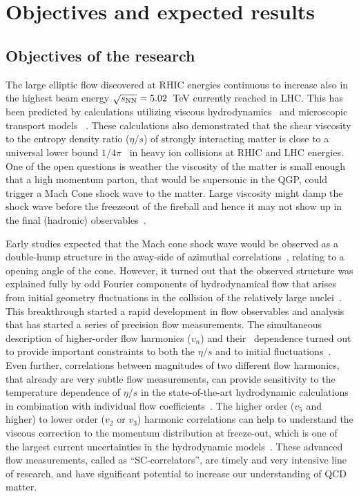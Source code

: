\section{Objectives and expected results} %
\label{sec:objectives}

\subsection{Objectives of the research}

The large elliptic flow discovered at RHIC energies continuous to increase also in the highest beam energy $\sqrt{s_{\rm NN}}=5.02$~TeV currently reached in LHC. This has been predicted by calculations utilizing viscous hydrodynamics~\cite{PhysRevLett.99.172301} and microscopic transport models ~\cite{PhysRevLett.101.082302}.  These calculations also demonstrated that the shear viscosity to the entropy density ratio ($\eta/s$) of strongly interacting matter is close to a universal lower bound $1/4\pi$~\cite{PhysRevLett.94.111601} in heavy ion collisions at RHIC and LHC energies. One of the open questions is weather the viscosity of the matter is small enough that a high momentum parton, that would be supersonic in the QGP, could trigger a Mach Cone shock wave to the matter. Large viscosity might damp the shock wave before the freezeout of the fireball and hence it may not show up in the final (hadronic) observables~\cite{Bouras:2010nt,Bouras:2012mh,PhysRevC.90.024904}.

Early studies expected that the Mach cone shock wave would be observed as a double-hump structure in the away-side of azimuthal correlations~\cite{CasalderreySolana:2004qm}, relating to a opening angle of the cone. However, it turned out that the observed structure was explained fully by odd Fourier components of hydrodynamical flow that arises from initial geometry fluctuations 
in the collision of the relatively large nuclei~\cite{Luzum:2012wu,ALICE:2011ab}. This breakthrough started a rapid development in flow observables and analysis that has started a series of precision flow measurements. The simultaneous description of higher-order flow harmonics ($v_{n}$) and their \pt{}\ dependence turned out to provide important constraints to both the $\eta/s$ and to initial fluctuations~\cite{Luzum:2012wu}. Even further, correlations between magnitudes of two different flow harmonics, that already are very subtle flow measurements, can provide sensitivity to the temperature dependence of $\eta/s$ in the state-of-the-art hydrodynamic calculations~\cite{Niemi:2015qia} in combination with individual flow coefficients~\cite{ALICE:2016kpq}. The higher order ($v_5$ and higher) to lower order ($v_2$ or $v_3$) harmonic correlations can help to understand the viscous correction to the momentum distribution at freeze-out, which is one of the largest current uncertainties in the hydrodynamic models~\cite{PhysRevC.86.044908,Niemi:2015qia}. These advanced flow measurements, called as ``SC-correlators'', are timely and very intensive line of research, and have significant potential to increase our understanding of QCD matter.

